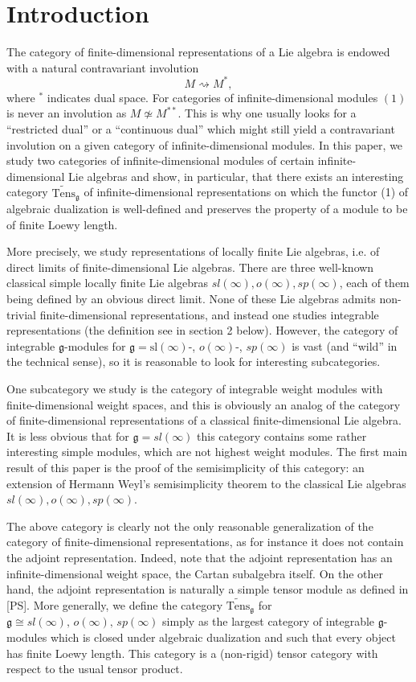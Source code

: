\documentclass{birkmult}
\newcounter{theorem}
\renewcommand{\gg}{\mathfrak{g}}
\renewcommand{\sl}{\mathrm{sl}}
\newcommand{\ds}{\displaystyle}
\newcommand{\lind}{\widetilde{\mathrm{Tens}}}
\begin{document}
\section{Introduction}

The category of finite-dimensional representations of a Lie
algebra is endowed with a natural contravariant involution
\begin{equation}\label{eq1}
M\rightsquigarrow M^{*},
\end{equation}
where $^*$ indicates dual space. For categories of
infinite-dimensional modules $(1)$ is never an
involution as $M\not\simeq M^{**}$. This is why one usually looks
for a ``restricted dual'' or a ``continuous dual'' which might
still yield a contravariant involution on a given category of
infinite-dimensional modules. In this paper, we study two
categories of infinite-dimensional modules of certain
infinite-dimensional Lie algebras and show, in particular, that
there exists an interesting category $\lind_\gg$ of
infinite-dimensional representations on which the functor (1) of
algebraic dualization is well-defined and preserves the property
of a module to be of finite Loewy length. 

More precisely, we study representations of locally finite Lie
algebras, i.e. of direct limits of finite-dimensional Lie
algebras. There are three well-known classical simple locally
finite Lie algebras $sl(\infty), o(\infty), sp(\infty)$, each of
them being defined by an obvious direct limit. None of these Lie
algebras admits non-trivial finite-dimensional representations,
and instead one studies integrable representations (the definition
see in section 2 below). However, the category of integrable
$\gg$-modules for $\gg=\sl(\infty)$-, $o(\infty)$-, $sp(\infty)$ is vast (and ``wild'' in the technical sense), so it
is reasonable to look for interesting subcategories.

One subcategory we study is the category of integrable weight
modules with finite-dimensional weight spaces, and this is obviously an
analog of the category of finite-dimensional representations of
a classical finite-dimensional Lie algebra. It is less obvious
that for $\ds \gg=sl(\infty)$ this category contains some rather
interesting simple modules, which are not highest weight modules.
The first main result of this paper is the proof of the
semisimplicity of this category: an extension of Hermann Weyl's
semisimplicity theorem to the classical Lie algebras $sl(\infty),
o(\infty), sp(\infty)$.

The above category is clearly not the only reasonable
generalization of the category of finite-dimensional
representations, as for instance it does not contain the adjoint
representation. Indeed, note that the adjoint representation has
an infinite-dimensional weight space, the Cartan subalgebra
itself. On the other hand, the adjoint representation is naturally
a simple tensor module as defined in [PS]. More generally, we
define the category $\lind_\gg$ for $\gg\cong
sl(\infty),\,o(\infty),\,sp(\infty)$ simply as the largest
category of integrable $\gg$-modules which is closed under
algebraic dualization and such that every object has finite Loewy
length. This category is a (non-rigid) tensor category with respect
to the usual tensor product. 
\end{document}
